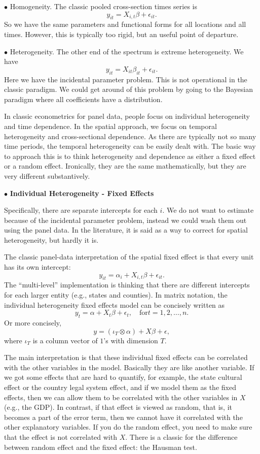 \documentclass[11pt,a4paper]{amsart}
\theoremstyle{plain}
\theoremstyle{definition}
\begin{document}
$\bullet$ Homogeneity. The classic pooled cross-section times series is 
\[	y_{it} = X_{i,t}\beta + \epsilon_{it}.	\]
So we have the same parameters and functional forms for all locations and all times. However, this is typically too rigid, but an useful point of departure.

$\bullet$ Heterogeneity. The other end of the spectrum is extreme heterogeneity. We have 
\[	y_{it} = X_{it}\beta_{it} + \epsilon_{it}.	\]
Here we have the incidental parameter problem. This is not operational in the classic paradigm. We could get around of this problem by going to the Bayesian paradigm where all coefficients have a distribution.

In classic econometrics for panel data, people focus on individual heterogeneity and time dependence. In the spatial approach, we focus on temporal heterogeneity and cross-sectional dependence. As there are typically not so many time periods, the temporal heterogeneity can be easily dealt with. The basic way to approach this is to think heterogeneity and dependence as either a fixed effect or a random effect. Ironically, they are the same mathematically, but they are very different substantively. 

$\bullet$ \textbf{Individual Heterogeneity - Fixed Effects}\hfill\par 
Specifically, there are separate intercepts for each $i$. We do not want to estimate because of the incidental parameter problem, instead we could wash them out using the panel data. In the literature, it is said as a way to correct for spatial heterogeneity, but hardly it is.

The classic panel-data interpretation of the spatial fixed effect is that every unit has its own intercept:
\[	y_{it} = \alpha_{i} + X_{i,t}\beta + \epsilon_{it}.	\]
The ``multi-level'' implementation is thinking that there are different intercepts for each larger entity (e.g., states and counties). In matrix notation, the individual heterogeneity fixed effects model can be concisely written as 
\[	y_{t} = \alpha + X_{t}\beta + \epsilon_{t},\quad \text{for} t = 1,2, \dots, n.	\]
Or more concisely,
\[	y = (\iota_{T} \otimes \alpha) + X\beta + \epsilon,	\]
where $\iota_{T}$ is a column vector of $1$'s with dimension $T$.

The main interpretation is that these individual fixed effects can be correlated with the other variables in the model. Basically they are like another variable. If we got some effects that are hard to quantify, for example, the state cultural effect or the country legal system effect, and if we model them as the fixed effects, then we can allow them to be correlated with the other variables in $X$ (e.g., the GDP). In contrast, if that effect is viewed as random, that is, it becomes a part of the error term, then we cannot have it correlated with the other explanatory variables. If you do the random effect, you need to make sure that the effect is not correlated with $X$. There is a classic for the difference between random effect and the fixed effect: the Hausman test.
\end{document}
